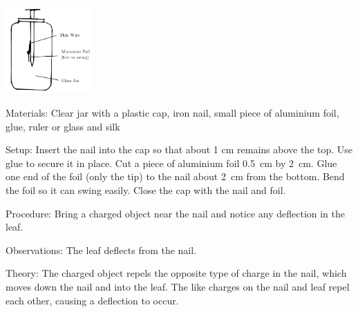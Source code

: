 \begin{multicols}{2}
\begin{center}
\includegraphics[width=0.25\textwidth]{./img/al-leaf-electroscope.png}
\end{center}

\begin{description*}
\item[Materials:]{Clear jar with a plastic cap, iron nail, small piece of aluminium foil, glue, ruler or glass and silk}
\item[Setup:]{Insert the nail into the cap so that about 1 cm remains above the top. Use glue to secure it in place. Cut a piece of aluminium foil 0.5~cm by 2~cm. Glue one end of the foil (only the tip) to the nail about 2~cm from the bottom. Bend the foil so it can swing easily. Close the cap with the nail and foil.}
\item[Procedure:]{Bring a charged object near the nail and notice any deflection in the leaf.}
\item[Observations:]{The leaf deflects from the nail.}
\item[Theory:]{The charged object repels the opposite type of charge in the nail, which moves down the nail and into the leaf. The like charges on the nail and leaf repel each other, causing a deflection to occur.}
\end{description*}

%
%


\end{multicols}
